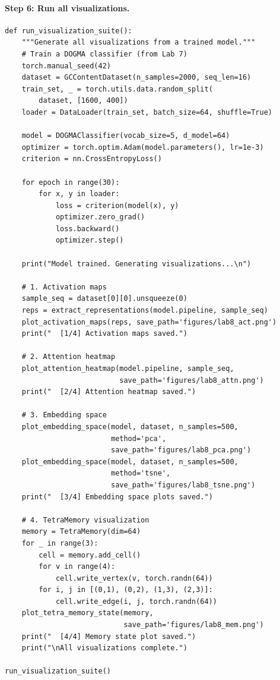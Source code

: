 \paragraph{Step 6: Run all visualizations.}

\begin{lstlisting}[style=dogmapython, caption={Lab 8: Running the complete visualization suite.}]
def run_visualization_suite():
    """Generate all visualizations from a trained model."""
    # Train a DOGMA classifier (from Lab 7)
    torch.manual_seed(42)
    dataset = GCContentDataset(n_samples=2000, seq_len=16)
    train_set, _ = torch.utils.data.random_split(
        dataset, [1600, 400])
    loader = DataLoader(train_set, batch_size=64, shuffle=True)

    model = DOGMAClassifier(vocab_size=5, d_model=64)
    optimizer = torch.optim.Adam(model.parameters(), lr=1e-3)
    criterion = nn.CrossEntropyLoss()

    for epoch in range(30):
        for x, y in loader:
            loss = criterion(model(x), y)
            optimizer.zero_grad()
            loss.backward()
            optimizer.step()

    print("Model trained. Generating visualizations...\n")

    # 1. Activation maps
    sample_seq = dataset[0][0].unsqueeze(0)
    reps = extract_representations(model.pipeline, sample_seq)
    plot_activation_maps(reps, save_path='figures/lab8_act.png')
    print("  [1/4] Activation maps saved.")

    # 2. Attention heatmap
    plot_attention_heatmap(model.pipeline, sample_seq,
                           save_path='figures/lab8_attn.png')
    print("  [2/4] Attention heatmap saved.")

    # 3. Embedding space
    plot_embedding_space(model, dataset, n_samples=500,
                         method='pca',
                         save_path='figures/lab8_pca.png')
    plot_embedding_space(model, dataset, n_samples=500,
                         method='tsne',
                         save_path='figures/lab8_tsne.png')
    print("  [3/4] Embedding space plots saved.")

    # 4. TetraMemory visualization
    memory = TetraMemory(dim=64)
    for _ in range(3):
        cell = memory.add_cell()
        for v in range(4):
            cell.write_vertex(v, torch.randn(64))
        for i, j in [(0,1), (0,2), (1,3), (2,3)]:
            cell.write_edge(i, j, torch.randn(64))
    plot_tetra_memory_state(memory,
                            save_path='figures/lab8_mem.png')
    print("  [4/4] Memory state plot saved.")
    print("\nAll visualizations complete.")

run_visualization_suite()
\end{lstlisting}

